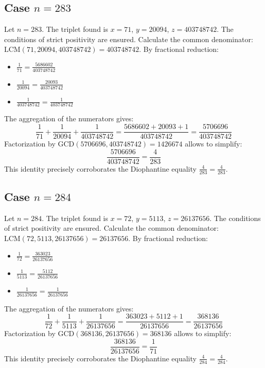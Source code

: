 \documentclass[11pt,a4paper]{article}
\begin{document}
\subsection{Case $n = 283$}
Let $n = 283$. The triplet found is $x = 71$, $y = 20094$, $z = 403748742$.
The conditions of strict positivity are ensured.
Calculate the common denominator: $\text{LCM}(71, 20094, 403748742) = 403748742$.
By fractional reduction:
\begin{itemize}
    \item $\frac{1}{71} = \frac{5686602}{403748742}$
    \item $\frac{1}{20094} = \frac{20093}{403748742}$
    \item $\frac{1}{403748742} = \frac{1}{403748742}$
\end{itemize}
The aggregation of the numerators gives:
$$ \frac{1}{71} + \frac{1}{20094} + \frac{1}{403748742} = \frac{5686602 + 20093 + 1}{403748742} = \frac{5706696}{403748742} $$
Factorization by $\text{GCD}(5706696, 403748742) = 1426674$ allows to simplify:
$$ \frac{5706696}{403748742} = \frac{4}{283} $$
This identity precisely corroborates the Diophantine equality $\frac{4}{283} = \frac{4}{283}$.

\subsection{Case $n = 284$}
Let $n = 284$. The triplet found is $x = 72$, $y = 5113$, $z = 26137656$.
The conditions of strict positivity are ensured.
Calculate the common denominator: $\text{LCM}(72, 5113, 26137656) = 26137656$.
By fractional reduction:
\begin{itemize}
    \item $\frac{1}{72} = \frac{363023}{26137656}$
    \item $\frac{1}{5113} = \frac{5112}{26137656}$
    \item $\frac{1}{26137656} = \frac{1}{26137656}$
\end{itemize}
The aggregation of the numerators gives:
$$ \frac{1}{72} + \frac{1}{5113} + \frac{1}{26137656} = \frac{363023 + 5112 + 1}{26137656} = \frac{368136}{26137656} $$
Factorization by $\text{GCD}(368136, 26137656) = 368136$ allows to simplify:
$$ \frac{368136}{26137656} = \frac{1}{71} $$
This identity precisely corroborates the Diophantine equality $\frac{4}{284} = \frac{4}{284}$.
\end{document}
